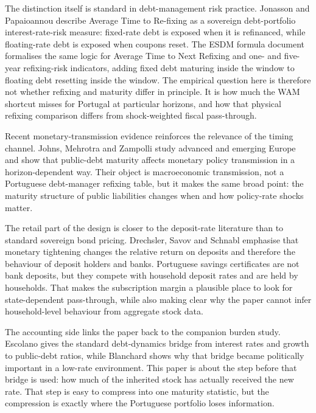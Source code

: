 \documentclass[11pt,a4paper]{article}
\begin{document}
The distinction itself is standard in debt-management risk practice. Jonasson
and Papaioannou \cite{jonasson2018} describe Average Time to Re-fixing as a
sovereign debt-portfolio interest-rate-risk measure: fixed-rate debt is exposed
when it is refinanced, while floating-rate debt is exposed when coupons reset.
The ESDM formula document \cite{esdm2022} formalises the same logic for
Average Time to Next Refixing and one- and five-year refixing-risk indicators,
adding fixed debt maturing inside the window to floating debt resetting inside
the window. The empirical question here is therefore not whether refixing and
maturity differ in principle. It is how much the WAM shortcut misses for
Portugal at particular horizons, and how that physical refixing comparison
differs from shock-weighted fiscal pass-through.

Recent monetary-transmission evidence reinforces the relevance of the timing
channel. Johns, Mehrotra and Zampolli \cite{johns2026} study advanced and
emerging Europe and show that public-debt maturity affects monetary policy
transmission in a horizon-dependent way. Their object is macroeconomic
transmission, not a Portuguese debt-manager refixing table, but it makes the
same broad point: the maturity structure of public liabilities changes when
and how policy-rate shocks matter.

The retail part of the design is closer to the deposit-rate literature than to
standard sovereign bond pricing. Drechsler, Savov and Schnabl
\cite{drechsler2017} emphasise that monetary tightening changes the relative
return on deposits and therefore the behaviour of deposit holders and banks.
Portuguese savings certificates are not bank deposits, but they compete with
household deposit rates and are held by households. That makes the
subscription margin a plausible place to look for state-dependent pass-through,
while also making clear why the paper cannot infer household-level behaviour
from aggregate stock data.

The accounting side links the paper back to the companion burden study.
Escolano \cite{escolano2010} gives the standard debt-dynamics bridge from
interest rates and growth to public-debt ratios, while Blanchard
\cite{blanchard2019} shows why that bridge became politically important in a
low-rate environment. This paper is about the step before that bridge is used:
how much of the inherited stock has actually received the new rate. That step
is easy to compress into one maturity statistic, but the compression is exactly
where the Portuguese portfolio loses information.
\end{document}
